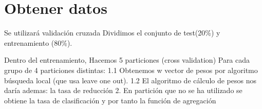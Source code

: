\section{Obtener datos }  

Se utilizará validación cruzada  
Dividimos el conjunto de test(20\%) y entrenamiento (80\%).

Dentro del entrenamiento, 
Hacemos 5 particiones (cross validation)
Para cada grupo de 4 particiones distintas: 
    1.1 Obtenemos w vector de pesos por algoritmo búsqueda local (que usa leave one out).
    1.2 El algoritmo de cálculo de pesos nos daría ademas:  la tasa de reducción
    2. En partición que no se ha utilizado se obtiene la tasa de clasificación y por tanto la función de agregación 
